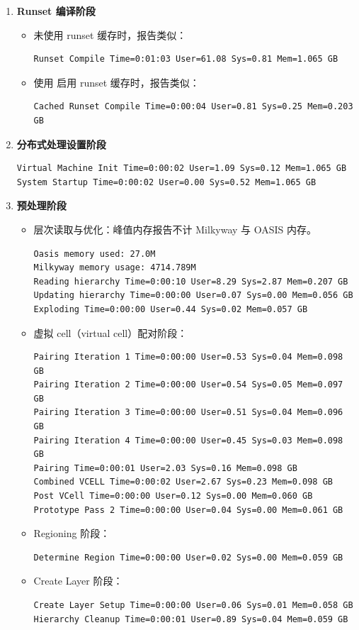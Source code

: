 \begin{enumerate}
  \item \textbf{Runset 编译阶段}
  \begin{itemize}
    \item 未使用 runset 缓存时，报告类似：
\begin{lstlisting}
Runset Compile Time=0:01:03 User=61.08 Sys=0.81 Mem=1.065 GB
\end{lstlisting}
    \item 使用  启用 runset 缓存时，报告类似：
\begin{lstlisting}
Cached Runset Compile Time=0:00:04 User=0.81 Sys=0.25 Mem=0.203 GB
\end{lstlisting}
  \end{itemize}

  \item \textbf{分布式处理设置阶段}
\begin{lstlisting}
Virtual Machine Init Time=0:00:02 User=1.09 Sys=0.12 Mem=1.065 GB
System Startup Time=0:00:02 User=0.00 Sys=0.52 Mem=1.065 GB
\end{lstlisting}

  \item \textbf{预处理阶段}
  \begin{itemize}
    \item 层次读取与优化：峰值内存报告不计 Milkyway 与 OASIS 内存。
\begin{lstlisting}
Oasis memory used: 27.0M
Milkyway memory usage: 4714.789M
Reading hierarchy Time=0:00:10 User=8.29 Sys=2.87 Mem=0.207 GB
Updating hierarchy Time=0:00:00 User=0.07 Sys=0.00 Mem=0.056 GB
Exploding Time=0:00:00 User=0.44 Sys=0.02 Mem=0.057 GB
\end{lstlisting}
    \item 虚拟 cell（virtual cell）配对阶段：
\begin{lstlisting}
Pairing Iteration 1 Time=0:00:00 User=0.53 Sys=0.04 Mem=0.098 GB
Pairing Iteration 2 Time=0:00:00 User=0.54 Sys=0.05 Mem=0.097 GB
Pairing Iteration 3 Time=0:00:00 User=0.51 Sys=0.04 Mem=0.096 GB
Pairing Iteration 4 Time=0:00:00 User=0.45 Sys=0.03 Mem=0.098 GB
Pairing Time=0:00:01 User=2.03 Sys=0.16 Mem=0.098 GB
Combined VCELL Time=0:00:02 User=2.67 Sys=0.23 Mem=0.098 GB
Post VCell Time=0:00:00 User=0.12 Sys=0.00 Mem=0.060 GB
Prototype Pass 2 Time=0:00:00 User=0.04 Sys=0.00 Mem=0.061 GB
\end{lstlisting}
    \item Regioning 阶段：
\begin{lstlisting}
Determine Region Time=0:00:00 User=0.02 Sys=0.00 Mem=0.059 GB
\end{lstlisting}
    \item Create Layer 阶段：
\begin{lstlisting}
Create Layer Setup Time=0:00:00 User=0.06 Sys=0.01 Mem=0.058 GB
Hierarchy Cleanup Time=0:00:01 User=0.89 Sys=0.04 Mem=0.059 GB
\end{lstlisting}
  \end{itemize}


\end{enumerate}
